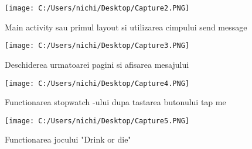 \texttt{[image: C:/Users/nichi/Desktop/Capture2.PNG]}

	Main activity sau primul layout si utilizarea cimpului send message

\texttt{[image: C:/Users/nichi/Desktop/Capture3.PNG]}

	Deschiderea urmatoarei pagini si afisarea mesajului

\texttt{[image: C:/Users/nichi/Desktop/Capture4.PNG]}

	Functionarea stopwatch -ului dupa tastarea butonului tap me

\texttt{[image: C:/Users/nichi/Desktop/Capture5.PNG]}

	Functionarea jocului "Drink or die"







